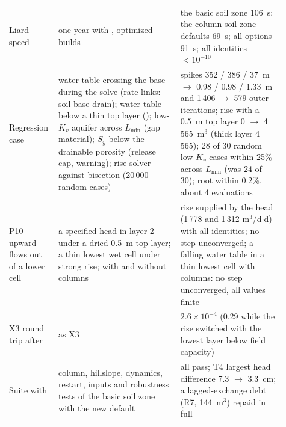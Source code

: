 \begin{longtable}{P{0.13\linewidth}P{0.42\linewidth}P{0.36\linewidth}}
Liard speed & one year with , optimized builds & the basic soil zone 106~s; the column soil zone defaults 69~s; all options 91~s; all identities $<10^{-10}$\\
Regression case & water table crossing the base during the solve (rate links: soil-base drain); water table below a thin top layer (); low-$K_v$ aquifer across $L_{\min}$ (gap material); $S_y$ below the drainable porosity (release cap, warning); rise solver against bisection (20\,000 random cases) & spikes 352 / 386 / 37~m $\to$ 0.98 / 0.98 / 1.33~m and 1\,406 $\to$ 579 outer iterations; rise with a 0.5~m top layer 0 $\to$ 4\,565~m$^3$ (thick layer 4\,565); 28 of 30 random low-$K_v$ cases within 25\% across $L_{\min}$ (was 24 of 30); root within 0.2\%, about 4 evaluations\\
P10 upward flows out of a lower cell & a specified head in layer 2 under a dried 0.5~m top layer; a thin lowest wet cell under strong rise; with and without columns & rise supplied by the head (1\,778 and 1\,312 m$^3$/d$\cdot$d) with all identities; no step unconverged; a falling water table in a thin lowest cell with columns: no step unconverged, all values finite\\
X3 round trip after & as X3 & $2.6\times10^{-4}$ (0.29 while the rise switched with the lowest layer below field capacity)\\
Suite with  & column, hillslope, dynamics, restart, inputs and robustness tests of the basic soil zone with the new default & all pass; T4 largest head difference 7.3 $\to$ 3.3~cm; a lagged-exchange debt (R7, 144~m$^3$) repaid in full\\
\bottomrule
\end{longtable}

